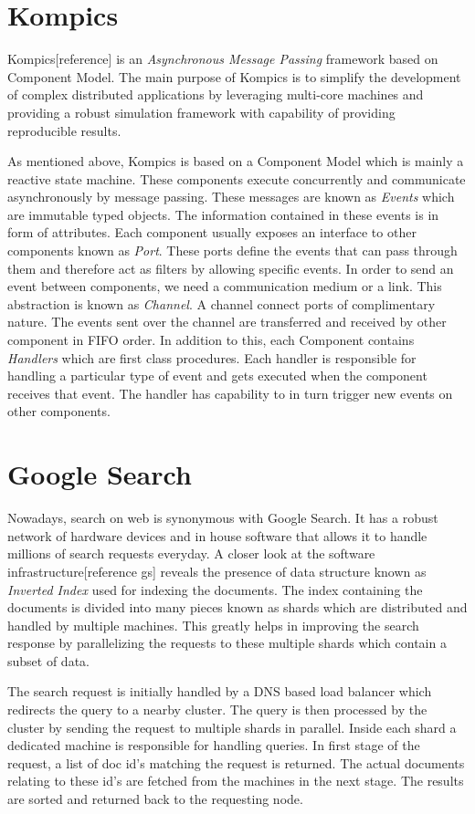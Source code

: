 \documentclass[12pt,a4paper,twoside,openright]{book}
\begin{document}
\section{Kompics}
Kompics[reference] is an \textit{Asynchronous Message Passing} framework based on Component Model. The main purpose of Kompics is to simplify the development of complex distributed applications by leveraging multi-core machines and providing a robust simulation framework with capability of providing reproducible results. 
\par As mentioned above, Kompics is based on a Component Model which is mainly a reactive state machine. These components execute concurrently and communicate asynchronously by message passing. These messages are known as \textit{Events} which are immutable typed objects. The information contained in these events is in form of attributes. Each component usually exposes an interface to other components known as \textit{Port}. These ports define the events that can pass through them and therefore act as filters by allowing specific events. In order to send an event between components, we need a communication medium or a link. This abstraction is known as \textit{Channel}. A channel connect ports of complimentary nature. The events sent over the channel are transferred and received by other component in FIFO order. In addition to this, each Component contains \textit{Handlers} which are first class procedures. Each handler is responsible for handling a particular type of event and gets executed when the component receives that event. The handler has capability to in turn trigger new events on other components. 


\section{Google Search}
Nowadays, search on web is synonymous with Google Search. It has a robust network of hardware devices and in house software that allows it to handle millions of search requests everyday. A closer look at the software infrastructure[reference gs] reveals the presence of data structure known as \textit{Inverted Index} used for indexing the documents. The index containing the documents is divided into many pieces known as shards which are distributed and handled by multiple machines. This greatly helps in improving the search response by parallelizing the requests to these multiple shards which contain a subset of data. 
\par The search request is initially handled by a DNS based load balancer which redirects the query to a nearby cluster. The query is then processed by the cluster by sending the request to multiple shards in parallel. Inside each shard a dedicated machine is responsible for handling queries. In first stage of the request, a list of doc id's matching the request is returned. The actual documents relating to these id's are fetched from the machines in the next stage. The results are sorted and returned back to the requesting node.
\end{document}
